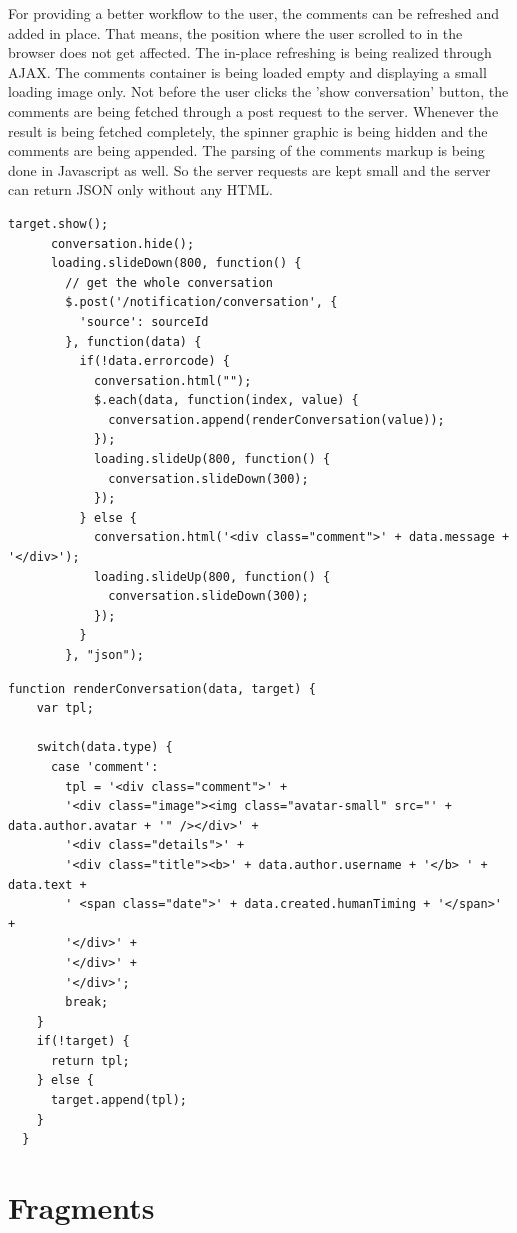 For providing a better workflow to the user, the comments can be refreshed and added in place. That means, the position where the user scrolled to in the browser does not get affected. The in-place refreshing is being realized through AJAX. The comments container is being loaded empty and displaying a small loading image only. Not before the user clicks the 'show conversation' button, the comments are being fetched through a post request to the server. Whenever the result is being fetched completely, the spinner graphic is being hidden and the comments are being appended. The parsing of the comments markup is being done in Javascript as well. So the server requests are kept small and the server can return JSON only without any HTML.

\begin{lstlisting}[caption=Refreshing the comments of a resource]
	target.show();
      conversation.hide();
      loading.slideDown(800, function() {
        // get the whole conversation
        $.post('/notification/conversation', {
          'source': sourceId
        }, function(data) {
          if(!data.errorcode) {
            conversation.html("");
            $.each(data, function(index, value) {
              conversation.append(renderConversation(value));
            });
            loading.slideUp(800, function() {
              conversation.slideDown(300);
            });
          } else {
            conversation.html('<div class="comment">' + data.message + '</div>');
            loading.slideUp(800, function() {
              conversation.slideDown(300);
            });
          }
        }, "json");
\end{lstlisting}

\begin{lstlisting}[caption=Creating the markup of a single comment]
function renderConversation(data, target) {
    var tpl;
    
    switch(data.type) {
      case 'comment':
        tpl = '<div class="comment">' +
        '<div class="image"><img class="avatar-small" src="' + data.author.avatar + '" /></div>' +
        '<div class="details">' +
        '<div class="title"><b>' + data.author.username + '</b> ' + data.text + 
        ' <span class="date">' + data.created.humanTiming + '</span>' +
        '</div>' +
        '</div>' +
        '</div>';
        break;
    }
    if(!target) {
      return tpl;
    } else {
      target.append(tpl);
    }
  }
\end{lstlisting}

\section{Fragments}

